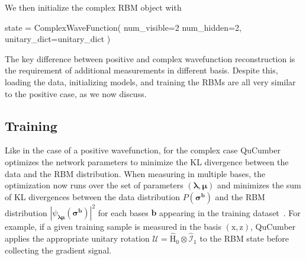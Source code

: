 \documentclass[submission, Phys, hidelnks]{SciPost}
\begin{document}
We then initialize the complex RBM object with
\begin{python}
state = ComplexWaveFunction(
   num_visible=2 num_hidden=2, unitary_dict=unitary_dict
)
\end{python}
The key difference between positive and complex wavefunction reconstruction is
the requirement of additional measurements in different basis. Despite this,
loading the data, initializing models, and training the RBMs are all very
similar to the positive case, as we now discuss.

\subsection{Training}
Like in the case of a positive wavefunction, for the complex case
QuCumber optimizes the network parameters to minimize the KL divergence between
the data and the RBM distribution. When measuring in multiple bases, the
optimization now runs over the set of parameters $(\bm{\lambda},\bm{\mu})$ and
minimizes the sum of KL divergences between the data distribution
$P(\bm{\sigma}^{\bm{b}})$ and the RBM distribution
 $|\psi_{\bm{\lambda\mu}}(\bm{\sigma}^{\bm{b}})|^2$ for each bases $\bm{b}$
 appearing in the training dataset~\cite{torlai_neural-network_2018}.
For example, if a given training sample is measured in the basis
 $(\mathrm{x},\mathrm{z})$, QuCumber applies the appropriate unitary
 rotation $\bm{\mathcal{U}}=\hat{\mathrm{H}}_0\otimes\hat{\mathcal{I}}_1$ to
 the RBM state before collecting the gradient signal.
\end{document}
